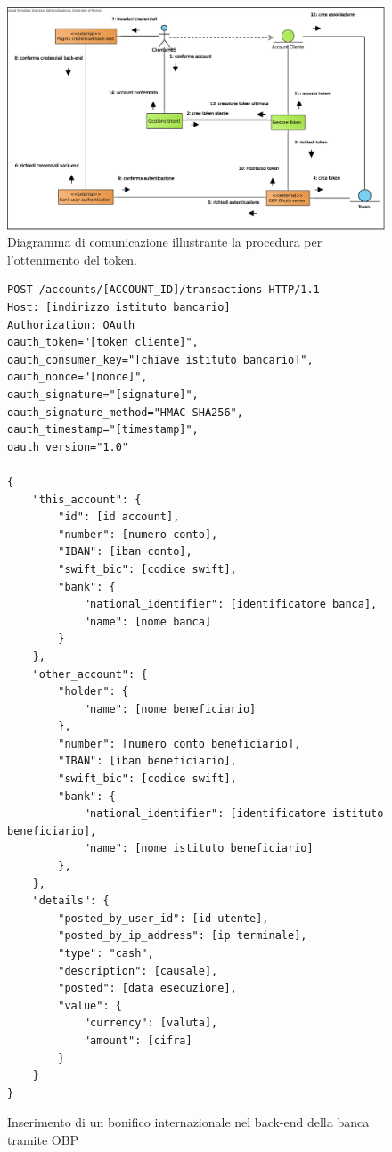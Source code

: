 \begin{figure}[h]
    \centering
	\includegraphics[width=\textwidth]{Images/Ottenimento_Token.eps}
    \caption{Diagramma di comunicazione illustrante la procedura per l'ottenimento del token.}
    \label{fig:oauth:token}
\end{figure}

\begin{figure}[h]
\begin{lstlisting}[basicstyle=\ttfamily]
POST /accounts/[ACCOUNT_ID]/transactions HTTP/1.1
Host: [indirizzo istituto bancario]
Authorization: OAuth
oauth_token="[token cliente]",
oauth_consumer_key="[chiave istituto bancario]",
oauth_nonce="[nonce]",
oauth_signature="[signature]",
oauth_signature_method="HMAC-SHA256",
oauth_timestamp="[timestamp]",
oauth_version="1.0"

{
    "this_account": {
        "id": [id account],
        "number": [numero conto],
        "IBAN": [iban conto],
        "swift_bic": [codice swift],
        "bank": {
            "national_identifier": [identificatore banca],
            "name": [nome banca]
        }
    },
    "other_account": {
        "holder": {
            "name": [nome beneficiario]
        },
        "number": [numero conto beneficiario],
        "IBAN": [iban beneficiario],
        "swift_bic": [codice swift],
        "bank": {
            "national_identifier": [identificatore istituto beneficiario],
            "name": [nome istituto beneficiario]
        },
    },
    "details": {
        "posted_by_user_id": [id utente],
        "posted_by_ip_address": [ip terminale],
        "type": "cash",
        "description": [causale],
        "posted": [data esecuzione],
        "value": {
            "currency": [valuta],
            "amount": [cifra]
        }
    }
}
\end{lstlisting}
	\caption{\label{fig:operazioni:bonifico-internazionale:json}Inserimento di un bonifico internazionale nel back-end della banca tramite OBP}
\end{figure}

